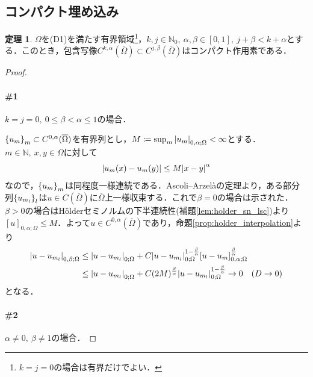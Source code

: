 \documentclass[a4paper]{ltjsarticle}
\newcommand{\Nset}{\mathbb{N}}
\newcommand{\Om}{\Omega}
\newcommand{\Ombar}{\overline{\Omega}}
\newcommand{\1}{\mathbbm{1}}
\numberwithin{equation}{section}
\theoremstyle{definition}
\newtheorem{thm}{定理}[section]
\begin{document}
\subsection{コンパクト埋め込み}
\begin{thm}\label{thm:holder_cpt_emb}
    $\Om$を(D1)を満たす有界領域\footnote{$k=j=0$の場合は有界だけでよい．}，$k,j\in\Nset_0,\ \alpha,\beta\in[0,1],\ j+\beta<k+\alpha$とする．このとき，包含写像$C^{k,\alpha}(\Ombar)\subset C^{j,\beta}(\Ombar)$はコンパクト作用素である．
\end{thm}
\begin{proof}
    \paragraph*{\#1}$k=j=0,\ 0\leq \beta<\alpha\leq 1$の場合．

    $\qty{u_m}_{m}\subset C^{0,\alpha}(\Ombar)$を有界列とし，$M\coloneqq \sup_{m}\abs{u_m}_{0,\alpha;\Om}<\infty$とする．$m\in\Nset,\ x,y\in\Om$に対して
    \begin{equation}
        \abs{u_m(x)-u_m(y)}\leq M\abs{x-y}^\alpha 
    \end{equation}
    なので，$\qty{u_m}_{m}$は同程度一様連続である．Ascoli--Arzelàの定理より，ある部分列$\qty{u_{m_l}}_l$は$u\in C(\Ombar)$に$\Ombar$上一様収束する．これで$\beta=0$の場合は示された．$\beta>0$の場合はHölderセミノルムの下半連続性(補題\ref{lem:holder_sn_lsc})より$[u]_{0,\alpha;\Om}\leq M$．よって$u\in C^{0,\alpha}(\Ombar)$であり，命題\ref{prop:holder_interpolation}より
    \begin{align}
        \abs{u-u_{m_l}}_{0,\beta;\Om}&\leq \abs{u-u_{m_l}}_{0;\Om}+C\abs{u-u_{m_l}}_{0;\Om}^{1-\frac{\beta}{\alpha}}[u-u_m]_{0,\alpha;\Om}^{\frac{\beta}{\alpha}}\\
        &\leq \abs{u-u_{m_l}}_{0;\Om}+C(2M)^{\frac{\beta}{\alpha}}\abs{u-u_{m_l}}_{0;\Om}^{1-\frac{\beta}{\alpha}}\to 0\quad (D\to 0)
    \end{align}
    となる．

    \paragraph*{\#2}$\alpha\neq0,\ \beta\neq1$の場合．


\end{proof}
\end{document}

